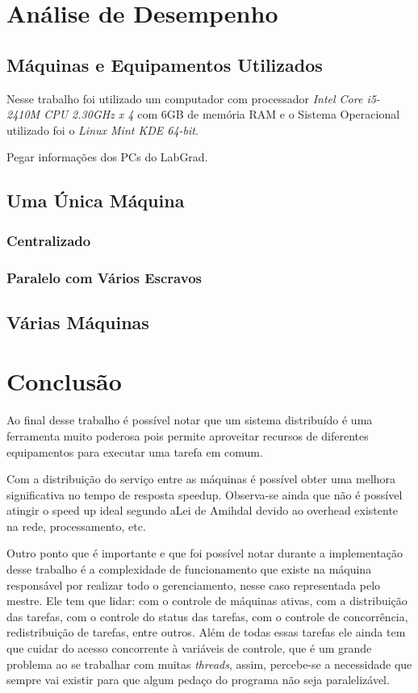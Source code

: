 \documentclass[
	12pt,				%
    oneside,			%
	a4paper,			%
	english,			%
	brazil,				%
	]{abntex2}
\begin{document}
\chapter{Análise de Desempenho} 
\section{Máquinas e Equipamentos Utilizados}
Nesse trabalho foi utilizado um computador com processador \textit{Intel Core i5-2410M CPU 2.30GHz x 4} com 6GB de 
memória RAM e o Sistema Operacional utilizado foi o \textit{Linux Mint KDE 64-bit}.


Pegar informações dos PCs do LabGrad.



\section{Uma Única Máquina}

\subsection{Centralizado}

\subsection{Paralelo com Vários Escravos}

\section{Várias Máquinas}

\chapter{Conclusão}

Ao final desse trabalho é possível notar que um sistema distribuído é uma ferramenta muito poderosa pois permite aproveitar recursos de diferentes equipamentos para executar uma tarefa em comum.

Com a distribuição do serviço entre as máquinas é possível obter uma melhora significativa no tempo de resposta speedup. 
Observa-se ainda que não é possível atingir o speed up ideal segundo aLei de Amihdal devido ao overhead existente na rede, processamento, etc.



Outro ponto que é importante e que foi possível notar durante a implementação desse trabalho é a complexidade de funcionamento que existe na máquina responsável por realizar todo o gerenciamento, nesse caso representada pelo mestre. Ele tem que lidar: com o controle de máquinas ativas, com a distribuição das tarefas, com o controle do status das tarefas, com o controle de concorrência, redistribuição de tarefas, entre outros. Além de todas essas tarefas ele ainda tem que cuidar do acesso
concorrente à variáveis de controle, que é um grande problema ao se trabalhar com muitas \textit{threads}, assim, percebe-se a necessidade que sempre vai existir para que algum pedaço do programa não seja paralelizável.
\end{document}

